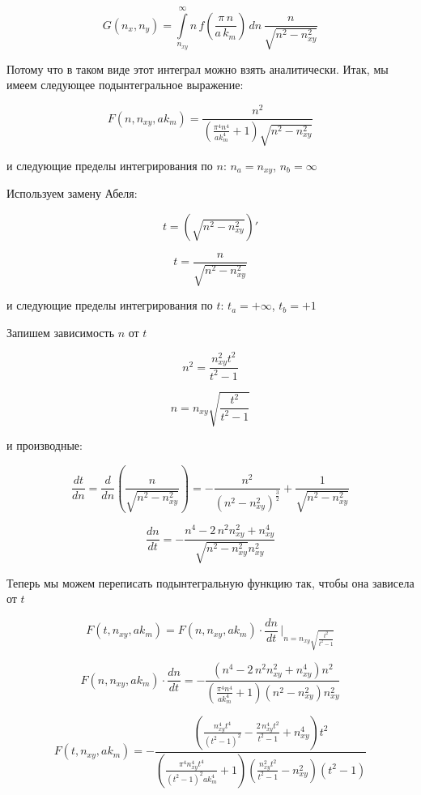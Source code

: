 \documentclass[11pt]{article}
\begin{document}
    \[
G\left(n_x, n_y\right) = \int\limits_{n_{xy}}^{\infty}n\,
f\left(\frac{\pi\,n}{a\,k_m}\right)\,dn\,{\frac{n}{\sqrt{n^{2} - n_{xy}^{2}}}}
\]

    Потому что в таком виде этот интеграл можно взять аналитически. Итак, мы
имеем следующее подынтегральное выражение:

    \[F\left(n, n_{xy}, ak_m\right) = \frac{n^{2}}{{\left(\frac{\pi^{4} n^{4}}{\mathit{ak}_{m}^{4}} + 1\right)} \sqrt{n^{2} - n_{\mathit{xy}}^{2}}}\]

    и следующие пределы интегрирования по \(n\): \(n_a = n_{xy}\),
\(n_b = \infty\)

    Используем замену Абеля:

\[t = \left(\sqrt{n^2-n_{xy}^2}\right)'\]

    \[t = \frac{n}{\sqrt{n^{2} - n_{\mathit{xy}}^{2}}}\]

    и следующие пределы интегрирования по \(t\): \(t_a = +\infty\),
\(t_b = +1\)

    Запишем зависимость \(n\) от \(t\)

    \[n^{2} = \frac{n_{\mathit{xy}}^{2} t^{2}}{t^{2} - 1}\]

    \[n = n_{\mathit{xy}} \sqrt{\frac{t^{2}}{t^{2} - 1}}\]

    и производные:

    \[\frac{dt}{dn} = \frac{d}{dn} \left( \frac{n}{\sqrt{n^{2} - n_{\mathit{xy}}^{2}}} \right)= -\frac{n^{2}}{{\left(n^{2} - n_{\mathit{xy}}^{2}\right)}^{\frac{3}{2}}} + \frac{1}{\sqrt{n^{2} - n_{\mathit{xy}}^{2}}}\]

    \[\frac{dn}{dt} = -\frac{n^{4} - 2 \, n^{2} n_{\mathit{xy}}^{2} + n_{\mathit{xy}}^{4}}{\sqrt{n^{2} - n_{\mathit{xy}}^{2}} n_{\mathit{xy}}^{2}}\]

    Теперь мы можем переписать подынтегральную функцию так, чтобы она
зависела от \(t\)

    \[F\left(t, n_{xy}, ak_m\right) = F\left(n, n_{xy}, ak_m\right) \cdot \frac{dn}{dt} \, \Bigg\rvert_{ n = n_{\mathit{xy}} \sqrt{\frac{t^{2}}{t^{2} - 1}} }\]

\[F\left(n, n_{xy}, ak_m\right) \cdot \frac{dn}{dt} = -\frac{{\left(n^{4} - 2 \, n^{2} n_{\mathit{xy}}^{2} + n_{\mathit{xy}}^{4}\right)} n^{2}}{{\left(\frac{\pi^{4} n^{4}}{\mathit{ak}_{m}^{4}} + 1\right)} {\left(n^{2} - n_{\mathit{xy}}^{2}\right)} n_{\mathit{xy}}^{2}}\]

\[F\left(t, n_{xy}, ak_m\right) = -\frac{{\left(\frac{n_{\mathit{xy}}^{4} t^{4}}{{\left(t^{2} - 1\right)}^{2}} - \frac{2 \, n_{\mathit{xy}}^{4} t^{2}}{t^{2} - 1} + n_{\mathit{xy}}^{4}\right)} t^{2}}{{\left(\frac{\pi^{4} n_{\mathit{xy}}^{4} t^{4}}{{\left(t^{2} - 1\right)}^{2} \mathit{ak}_{m}^{4}} + 1\right)} {\left(\frac{n_{\mathit{xy}}^{2} t^{2}}{t^{2} - 1} - n_{\mathit{xy}}^{2}\right)} {\left(t^{2} - 1\right)}}\]
\end{document}
